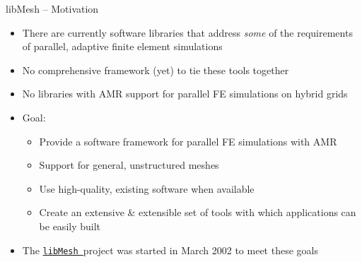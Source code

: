 \documentclass[landscape,pdftex,headrule,footrule]{foils}
\newcommand{\libMesh}{\href{http://libmesh.sourceforge.net}{\texttt{libMesh\ }}}
\begin{document}
\begin{foil}{libMesh -- Motivation}
  \begin{itemize}
    \tightlist
  \item There are currently software libraries that address \emph{some}
        of the requirements of parallel, adaptive finite element simulations
  \item No comprehensive framework (yet) to tie these tools together
  \item No libraries with AMR support for parallel FE simulations on hybrid grids
  \item Goal:
      \begin{itemize}
      \item Provide a software framework for parallel FE simulations with AMR
      \item Support for general, unstructured meshes
      \item Use high-quality, existing software when available
      \item Create an extensive \& extensible set of tools with which applications can be easily built
      \end{itemize}
    \item The \libMesh project was started in March 2002 to meet these goals
  \end{itemize}
\end{foil}
\end{document}
